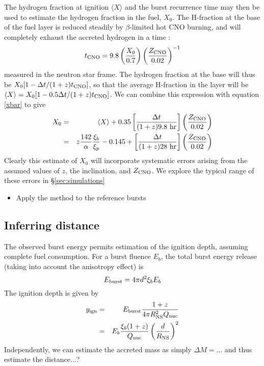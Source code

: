 \documentclass{aastex61}
\begin{document}
The hydrogen fraction at ignition $\langle X\rangle$ and the burst recurrence time may then be used to estimate the hydrogen fraction in the fuel, $X_0$. The H-fraction at the base of the fuel layer is reduced steadily by $\beta$-limited hot CNO burning, and will completely exhaust the accreted hydrogen in a time \cite[]{lampe16}:
\begin{equation}
t_{\rm CNO} =9.8\left(\frac{X_0}{0.7}\right) \left(\frac{Z_{\rm CNO}}{0.02}\right)^{-1}
\end{equation}
measured in the neutron star frame.
The hydrogen fraction at the base will thus be $X_0[1-\Delta t/(1+z)t_{\rm CNO}]$, 
so that the average H-fraction in the layer will be $\langle X \rangle = X_0[1-0.5\Delta t/(1+z)t_{\rm CNO}]$. We can combine this expression with equation \ref{xbar} to give
\begin{eqnarray}
X_0 & = & \langle X\rangle +0.35\left[\frac{\Delta t}{(1+z)9.8\ {\rm hr}}\right]
                            \left(\frac{Z_{\rm CNO}}{0.02}\right) \nonumber \\
    & = & z\frac{142}{\alpha}\frac{\xi_b}{\xi_p} - 0.145 
                           +\left[\frac{\Delta t}{(1+z)28\ {\rm hr}}\right]
                            \left(\frac{Z_{\rm CNO}}{0.02}\right)
\end{eqnarray}
Clearly this estimate of $X_0$ will incorporate systematic errors arising from the assumed values of $z$, the inclination, and $Z_{\rm CNO}$. We explore the typical range of these errors in 
\S\ref{sec:simulations}

\begin{itemize}
\item Apply the method to the reference bursts
\end{itemize}


\subsection{Inferring distance} 
\label{subsec:distance}

The observed burst energy permits estimation of the ignition depth, assuming complete fuel consumption. For a burst fluence $E_b$, the total burst energy release (taking into account the anisotropy effect) is
\begin{equation}
E_{\rm burst} = 4\pi d^2 \xi_b E_b 
\end{equation}
The ignition depth is given by 
\begin{eqnarray}
y_{\rm ign} & = & E_{\rm burst}\frac{1 + z}{4\pi R_{\rm NS}^2 Q_{\rm nuc}} \\
  & = & E_b \frac{\xi_b (1 + z)}{ Q_{\rm nuc}} \left(\frac{d}{R_{\rm NS}}\right)^2 
\end{eqnarray}
Independently, we can estimate the accreted mass as simply $\Delta M = ...$ and thus estimate the distance...?
\end{document}
